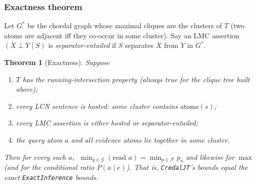 \documentclass[11pt]{article}
\newtheorem{theorem}{Theorem}
\begin{document}
\subsubsection{Exactness theorem}\label{sec:d5-exactness-thm}

Let $G^\ast$ be the chordal graph whose maximal cliques are the clusters of $T$ (two atoms are
adjacent iff they co-occur in some cluster). Say an LMC assertion $(X\perp Y\mid S)$ is
\emph{separator-entailed} if $S$ separates $X$ from $Y$ in $G^\ast$.

\begin{theorem}[Exactness]\label{thm:d5-exact}
Suppose
\begin{enumerate}\itemsep1pt
  \item[\textnormal{(H1)}] $T$ has the running-intersection property \emph{(always true for the
    clique tree built above)};
  \item[\textnormal{(H2)}] every LCN sentence is hosted: some cluster contains $\mathrm{atoms}(s)$;
  \item[\textnormal{(H3)}] every LMC assertion is \emph{either} hosted \emph{or} separator-entailed;
  \item[\textnormal{(H4)}] the query atom $a$ and all evidence atoms lie together in some cluster.
\end{enumerate}
Then for every such $a$, $\;\min_{q\in\mathcal G}(\text{read }a)=\min_{p\in\mathcal F}p_a$ and
likewise for $\max$ \emph{(and for the conditional ratio $P(a\mid e)$)}. That is,
\texttt{CredalJT}'s bounds equal the exact \texttt{ExactInference} bounds.
\end{theorem}
\end{document}
